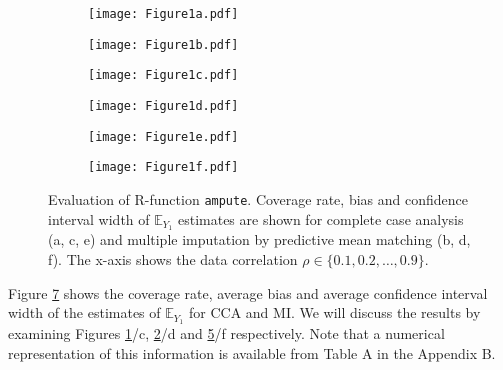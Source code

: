 \documentclass[11pt,a4paper]{article}
\newcommand{\code}[1]{\texttt{#1}}
\begin{document}
\begin{figure}[t!]
\begin{subfigure}{.51\textwidth}
\texttt{[image: Figure1a.pdf]}
\vspace{-2.2\baselineskip}
\subcaption{}
\label{01a}
\end{subfigure}
\vspace{-1.1\baselineskip}
\begin{subfigure}{.51\textwidth}
\texttt{[image: Figure1b.pdf]}
\vspace{-2.2\baselineskip}
\subcaption{}
\label{01b}
\end{subfigure}
\vspace{-1.1\baselineskip}
\begin{subfigure}{.51\textwidth}
\texttt{[image: Figure1c.pdf]}
\vspace{-2.2\baselineskip}
\subcaption{}
\label{01c}
\end{subfigure}
\begin{subfigure}{.51\textwidth}
\texttt{[image: Figure1d.pdf]}
\vspace{-2.2\baselineskip}
\subcaption{}
\label{01d}
\end{subfigure}
\begin{subfigure}{.51\textwidth}
\texttt{[image: Figure1e.pdf]}
\vspace{-2.2\baselineskip}
\subcaption{}
\label{01e}
\end{subfigure}
\begin{subfigure}{.51\textwidth}
\texttt{[image: Figure1f.pdf]}
\vspace{-2.2\baselineskip}
\subcaption{}
\label{01f}
\end{subfigure}
{\caption{\normalsize Evaluation of R-function \code{ampute}. Coverage rate, bias and confidence interval width of $\mathbb{E}_{Y_1}$ estimates are shown for complete case analysis (a, c, e) and multiple imputation by predictive mean matching (b, d, f). The x-axis shows the data correlation $\rho \in \{0.1, 0.2, \dots, 0.9\}$.}
\label{sim1}}
\end{figure}

Figure \ref{sim1} shows the coverage rate, average bias and average confidence interval width of the estimates of $\mathbb{E}_{Y_1}$ for CCA and MI. We will discuss the results by examining Figures \ref{01a}/c, \ref{01b}/d and \ref{01e}/f respectively. Note that a numerical representation of this information is available from Table A in the Appendix B. 
\end{document}
